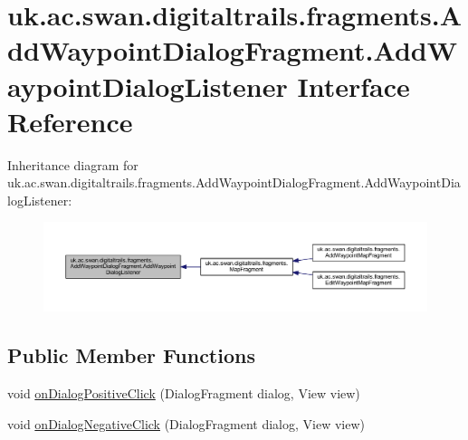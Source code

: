 \hypertarget{interfaceuk_1_1ac_1_1swan_1_1digitaltrails_1_1fragments_1_1_add_waypoint_dialog_fragment_1_1_add_waypoint_dialog_listener}{\section{uk.\+ac.\+swan.\+digitaltrails.\+fragments.\+Add\+Waypoint\+Dialog\+Fragment.\+Add\+Waypoint\+Dialog\+Listener Interface Reference}
\label{interfaceuk_1_1ac_1_1swan_1_1digitaltrails_1_1fragments_1_1_add_waypoint_dialog_fragment_1_1_add_waypoint_dialog_listener}
}


Inheritance diagram for uk.\+ac.\+swan.\+digitaltrails.\+fragments.\+Add\+Waypoint\+Dialog\+Fragment.\+Add\+Waypoint\+Dialog\+Listener\+:\nopagebreak
\begin{figure}[H]
\begin{center}
\leavevmode
\includegraphics[width=350pt]{interfaceuk_1_1ac_1_1swan_1_1digitaltrails_1_1fragments_1_1_add_waypoint_dialog_fragment_1_1_addb822b4004222eae83d00e69412923168}
\end{center}
\end{figure}
\subsection*{Public Member Functions}
\begin{DoxyCompactItemize}
\item 
void \hyperlink{interfaceuk_1_1ac_1_1swan_1_1digitaltrails_1_1fragments_1_1_add_waypoint_dialog_fragment_1_1_add_waypoint_dialog_listener_a3bd6666341faffa16f688119d97753f3}{on\+Dialog\+Positive\+Click} (Dialog\+Fragment dialog, View view)
\item 
void \hyperlink{interfaceuk_1_1ac_1_1swan_1_1digitaltrails_1_1fragments_1_1_add_waypoint_dialog_fragment_1_1_add_waypoint_dialog_listener_a8cbf919c183c0e8048a90e6bd30fdf04}{on\+Dialog\+Negative\+Click} (Dialog\+Fragment dialog, View view)
\end{DoxyCompactItemize}


